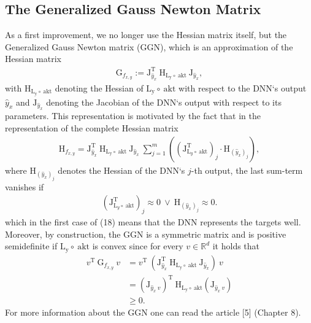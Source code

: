 \documentclass[conference]{IEEEtran}
\begin{document}
\subsection{The Generalized Gauss Newton Matrix}
As a first improvement, we no longer use the Hessian matrix itself, but the Generalized Gauss Newton matrix (GGN), which is an approximation of the Hessian matrix
\begin{align}
\mathrm{G}_{f_{x, y}} := \mathrm{J}_{\hat{y}_{x}}^{\mathrm{T}}\:\mathrm{H}_{\mathrm{L_{y}\circ\:\text{akt}}}\:\mathrm{J}_{\hat{y}_{x}},
\end{align}
with $\mathrm{H}_{\mathrm{L_{y}\circ\:\text{akt}}}$ denoting the Hessian of $\mathrm{L_{y}\circ\:\text{akt}}$ with respect to the DNN`s output $\hat{y}_{x}$ and $\mathrm{J}_{\hat{y}_{x}}$ denoting the Jacobian of the DNN`s output with respect to its parameters.
This representation is motivated by the fact that in the representation of the complete Hessian matrix
\begin{align}
\mathrm{H}_{f_{x, y}} = \mathrm{J}_{\hat{y}_{x}}^{\mathrm{T}}\:\mathrm{H}_{\mathrm{L_{y}\circ\:\text{akt}}}\:\mathrm{J}_{\hat{y}_{x}}\:\sum_{j = 1}^{m}\left(\left(\mathrm{J}_{\mathrm{L}_{y}\circ \:\text{akt}}^{\mathrm{T}}\right)_{j}\cdot\mathrm{H}_{(\hat{y}_{x})_{j}}\right),
\end{align}
where $\mathrm{H}_{(\hat{y}_{x})_{j}}$ denotes the Hessian of the DNN`s  $j$-th output, the last sum-term vanishes if 
\begin{align}
\left(\mathrm{J}_{\mathrm{L}_{y}\circ \:\text{akt}}^{\mathrm{T}}\right)_{j}\approx 0\:\lor\:\mathrm{H}_{(\hat{y}_{x})_{j}} \approx 0.
\end{align}
which in the first case of (18) means that the DNN represents the targets well.  Moreover, by construction, the GGN is a symmetric matrix and is positive semidefinite if $\mathrm{L_{y}\circ\:\text{akt}}$ is convex since for every $v\in\mathbb{R}^{d}$ it holds that
\begin{align}
v^{\mathrm{T}}\:\mathrm{G}_{f_{x, y}}\:v &= v^{\mathrm{T}}\:\left( \mathrm{J}_{\hat{y}_{x}}^{\mathrm{T}}\:\mathrm{H}_{\mathrm{L_{y}\circ\:\text{akt}}}\:\mathrm{J}_{\hat{y}_{x}}\right)\:v\\
&= \left(\mathrm{J}_{\hat{y}_{x}\:v}\right)^{\mathrm{T}}\:\mathrm{H}_{\mathrm{L_{y}\circ\:\text{akt}}}\left(\mathrm{J}_{\hat{y}_{x}\:v}\right) \\
&\geq 0.
\end{align}
For more information about the GGN one can read the article [5] (Chapter 8).
\end{document}

